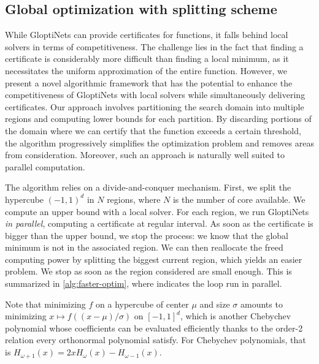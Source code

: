 \documentclass{article}
\begin{document}
\subsection{Global optimization with splitting scheme}

While GloptiNets can provide certificates for functions, it falls behind local solvers in terms of competitiveness. The challenge lies in the fact that finding a certificate is considerably more difficult than finding a local minimum, as it necessitates the uniform approximation of the entire function. However, we present a novel algorithmic framework that has the potential to enhance the competitiveness of GloptiNets with local solvers while simultaneously delivering certificates. Our approach involves partitioning the search domain into multiple regions and computing lower bounds for each partition. By discarding portions of the domain where we can certify that the function exceeds a certain threshold, the algorithm progressively simplifies the optimization problem and removes areas from consideration. Moreover, such an approach is naturally well suited to parallel computation.

The algorithm relies on a divide-and-conquer mechanism. First, we split the hypercube $(-1, 1)^d$ in $N$ regions, where $N$ is the number of core available. We compute an upper bound with a local solver. For each region, we run GloptiNets \emph{in parallel}, computing a certificate at regular interval. As soon as the certificate is bigger than the upper bound, we stop the process: we know that the global minimum is not in the associated region. We can then reallocate the freed computing power by splitting the biggest current region, which yields an easier problem. We stop as soon as the region considered are small enough. This is summarized in \cref{alg:faster-optim}, where  indicates the loop run in parallel.

Note that minimizing $f$ on a hypercube of center $\mu$ and size $\sigma$ amounts to minimizing $x \mapsto f((x - \mu)/\sigma)$ on $[-1, 1]^d$, which is another Chebychev polynomial whose coefficients can be evaluated efficiently thanks to the order-2 relation every orthonormal polynomial satisfy. For Chebychev polynomials, that is $H_{\omega + 1}(x) = 2x H_{\omega}(x) - H_{\omega - 1}(x)$.
\end{document}
